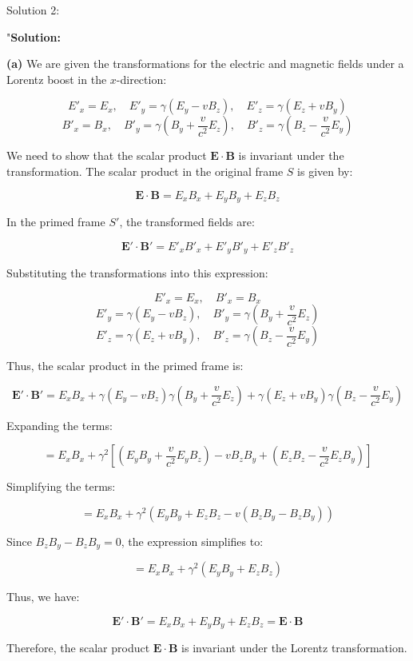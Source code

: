 Solution 2:

"\textbf{Solution:}

\textbf{(a)} We are given the transformations for the electric and magnetic fields under a Lorentz boost in the \( x \)-direction:

\[
E'_x = E_x, \quad E'_y = \gamma (E_y - v B_z), \quad E'_z = \gamma (E_z + v B_y)
\]
\[
B'_x = B_x, \quad B'_y = \gamma \left( B_y + \frac{v}{c^2} E_z \right), \quad B'_z = \gamma \left( B_z - \frac{v}{c^2} E_y \right)
\]

We need to show that the scalar product \( \mathbf{E} \cdot \mathbf{B} \) is invariant under the transformation. The scalar product in the original frame \( S \) is given by:

\[
\mathbf{E} \cdot \mathbf{B} = E_x B_x + E_y B_y + E_z B_z
\]

In the primed frame \( S' \), the transformed fields are:

\[
\mathbf{E}' \cdot \mathbf{B}' = E'_x B'_x + E'_y B'_y + E'_z B'_z
\]

Substituting the transformations into this expression:

\[
E'_x = E_x, \quad B'_x = B_x
\]
\[
E'_y = \gamma (E_y - v B_z), \quad B'_y = \gamma \left( B_y + \frac{v}{c^2} E_z \right)
\]
\[
E'_z = \gamma (E_z + v B_y), \quad B'_z = \gamma \left( B_z - \frac{v}{c^2} E_y \right)
\]

Thus, the scalar product in the primed frame is:

\[
\mathbf{E}' \cdot \mathbf{B}' = E_x B_x + \gamma (E_y - v B_z) \gamma \left( B_y + \frac{v}{c^2} E_z \right) + \gamma (E_z + v B_y) \gamma \left( B_z - \frac{v}{c^2} E_y \right)
\]

Expanding the terms:

\[
= E_x B_x + \gamma^2 \left[ (E_y B_y + \frac{v}{c^2} E_y B_z) - v B_z B_y + (E_z B_z - \frac{v}{c^2} E_z B_y) \right]
\]

Simplifying the terms:

\[
= E_x B_x + \gamma^2 \left( E_y B_y + E_z B_z - v (B_z B_y - B_z B_y) \right)
\]

Since \( B_z B_y - B_z B_y = 0 \), the expression simplifies to:

\[
= E_x B_x + \gamma^2 \left( E_y B_y + E_z B_z \right)
\]

Thus, we have:

\[
\mathbf{E}' \cdot \mathbf{B}' = E_x B_x + E_y B_y + E_z B_z = \mathbf{E} \cdot \mathbf{B}
\]

Therefore, the scalar product \( \mathbf{E} \cdot \mathbf{B} \) is invariant under the Lorentz transformation.

